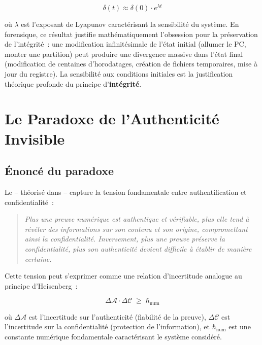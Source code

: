 \begin{equation}
\delta(t) \approx \delta(0) \cdot e^{\lambda t}
\label{eq:lyapunov}
\end{equation}

où $\lambda$ est l'exposant de Lyapunov caractérisant la sensibilité du
système. En forensique, ce résultat justifie mathématiquement l'obsession
pour la préservation de l'intégrité~: une modification infinitésimale de
l'état initial (allumer le PC, monter une partition) peut produire
une divergence massive dans l'état final (modification de centaines
d'horodatages, création de fichiers temporaires, mise à jour du registre).
La sensibilité aux conditions initiales est la justification théorique
profonde du principe d'\textbf{intégrité}.

\section{Le Paradoxe de l'Authenticité Invisible}

\subsection{Énoncé du paradoxe}

Le  -- théorisé dans \cite{minka2025zknr} -- capture
la tension fondamentale entre authentification et confidentialité~:

\begin{quotation}
\textit{Plus une preuve numérique est authentique et vérifiable, plus elle
tend à révéler des informations sur son contenu et son origine, compromettant
ainsi la confidentialité. Inversement, plus une preuve préserve la
confidentialité, plus son authenticité devient difficile à établir de
manière certaine.}
\end{quotation}

Cette tension peut s'exprimer comme une relation d'incertitude analogue
au principe d'Heisenberg~:

\begin{equation}
\Delta\mathcal{A} \cdot \Delta\mathcal{C} \;\geq\; \hbar_{\mathrm{num}}
\label{eq:authenticite-invisible}
\end{equation}

où $\Delta\mathcal{A}$ est l'incertitude sur l'authenticité (fiabilité de
la preuve), $\Delta\mathcal{C}$ est l'incertitude sur la confidentialité
(protection de l'information), et $\hbar_{\mathrm{num}}$ est une constante
numérique fondamentale caractérisant le système considéré.

